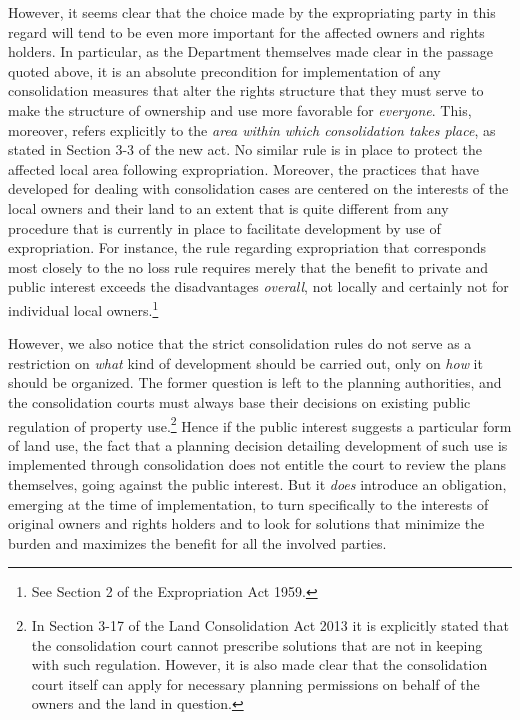 However, it seems clear that the choice made by the expropriating party in this regard will tend to be even more important for the affected owners and rights holders. In particular, as the Department themselves made clear in the passage quoted above, it is an absolute precondition for implementation of any consolidation measures that alter the rights structure that they must serve to make the structure of ownership and use more favorable for \emph{everyone}. This, moreover, refers explicitly to the \emph{area within which consolidation takes place}, as stated in Section 3-3 of the new act. No similar rule is in place to protect the affected local area following expropriation. Moreover, the practices that have developed for dealing with consolidation cases are centered on the interests of the local owners and their land to an extent that is quite different from any procedure that is currently in place to facilitate development by use of expropriation.
For instance, the rule regarding expropriation that corresponds most closely to the no loss rule  
requires merely that the benefit to private and public interest exceeds the disadvantages \emph{overall}, not locally and certainly not for individual local owners.\footnote{See Section 2 of the Expropriation Act 1959.} 


However, we also notice that the strict consolidation rules do not serve as a restriction on \emph{what} kind of development should be carried out, only on \emph{how} it should be organized. The former question is left to the planning authorities, and the consolidation courts must always base their decisions on existing public regulation of property use.\footnote{In Section 3-17 of the Land Consolidation Act 2013 it is explicitly stated that the consolidation court cannot prescribe solutions that are not in keeping with such regulation. However, it is also made clear that the consolidation court itself can apply for necessary planning permissions on behalf of the owners and the land in question.} Hence if the public interest suggests a particular form of land use, the fact that a planning decision detailing development of such use is implemented through consolidation does not entitle the court to review the plans themselves, going against the public interest. But it \emph{does} introduce an obligation, emerging at the time of implementation, to turn specifically to the interests of original owners and rights holders and to look for solutions that minimize the burden and maximizes the benefit for all the involved parties.

